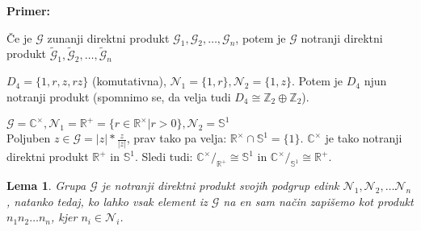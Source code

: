 \documentclass[a4paper]{article}
\newcounter{environment:definition_counter}
\newcounter{environment:theorem_counter}
\newcounter{environment:statement_counter}
\newcounter{example:example_counter}
\newenvironment{example}
{\textbf{Primer:}\\}
{\setcounter{example:example_counter}{0}}
\newenvironment{example_case}
{\refstepcounter{example:example_counter} \arabic{example:example_counter}.}
{\\}
\newtheorem{lemma}{Lema}
\begin{document}
\begin{example}
\begin{example_case}
Če je $\mathcal{G}$ zunanji direktni produkt $\mathcal{G}_1, \mathcal{G}_2, \dots ,\mathcal{G}_n$, potem je $\mathcal{G}$ notranji direktni produkt $\widetilde{\mathcal{G}}_1, \widetilde{\mathcal{G}}_2, \dots , \widetilde{\mathcal{G}}_n$
\end{example_case}
\begin{example_case}
$D_4 = \{ 1, r, z, rz \} $ (komutativna), $\mathcal{N}_1 = \{ 1,r \}, \mathcal{N}_2 = \{1,z\}$. Potem je $D_4$ njun notranji produkt (spomnimo se, da velja tudi $D_4 \cong \mathbb{Z}_2 \oplus \mathbb{Z}_2$).
\end{example_case}
\begin{example_case}
$\mathcal{G} = \mathbb{C}^{\times}, \mathcal{N}_1 = \mathbb{R}^{+} = \{ r \in \mathbb{R}^{\times} | r > 0\}, \mathcal{N}_2 = \mathbb{S}^{1}$\\
Poljuben $z \in \mathcal{G} = |z| * \frac{z}{|z|}$, prav tako pa velja: $\mathbb{R}^{\times} \cap \mathbb{S}^1 = \{1\}$. $\mathbb{C}^{\times}$ je tako notranji direktni produkt $\mathbb{R}^{+}$ in $\mathbb{S}^1$. Sledi tudi: $\mathbb{C}^{\times}/_{\mathbb{R}^{+}} \cong \mathbb{S}^1$ in $\mathbb{C}^{\times}/_{\mathbb{S}^{1}} \cong \mathbb{R}^+$.
\end{example_case}
\end{example}

\begin{lemma}
Grupa $\mathcal{G}$ je notranji direktni produkt svojih podgrup edink $\mathcal{N}_1, \mathcal{N}_2, \dots \mathcal{N}_n$, natanko tedaj, ko lahko vsak element iz $\mathcal{G}$ na en sam način zapišemo kot produkt $n_1 n_2 \dots n_n$, kjer $n_i \in \mathcal{N}_i$.
\end{lemma}
\end{document}
